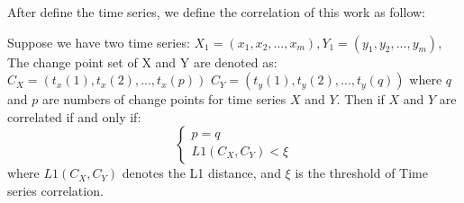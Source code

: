 After define the time series, we define the correlation of this work as follow:
\begin{definition} 
Suppose we have two time series: $X_1=(x_1,x_2,...,x_m),Y_1=(y_1,y_2,...,y_m)$, The change point set of X and Y are denoted as: 
$C_X=(t_x(1),t_x(2),...,t_x(p))$
$C_Y=(t_y(1),t_y(2),...,t_y(q))$
where $q$ and $p$ are numbers of change points for time series $X$ and $Y$.
Then if $X$ and $Y$ are correlated if and only if:
\begin{equation}
\left\{\begin{matrix}
p=q\\ 
L1(C_X,C_Y)<\xi 
\end{matrix}\right.
\end{equation}
where $L1(C_X,C_Y)$ denotes the L1 distance, and $\xi$ is the threshold of Time series correlation.
\end{definition}
